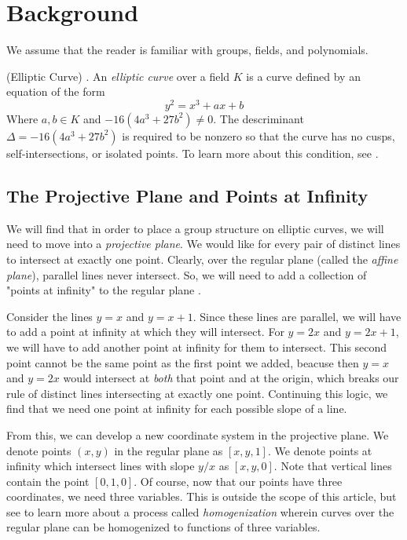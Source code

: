 \documentclass[]{math_paper}
\begin{document}
\section{Background} \label{sec:background}
We assume that the reader is familiar with groups, fields, and polynomials.

\begin{definition} (Elliptic Curve) \cite{stein2008elementary}. An \emph{elliptic curve} over a field $K$ is a curve defined by an equation of the form
    $$y^2 = x^3 + ax+ b$$
    Where $a, b \in K$ and $-16(4a^3 + 27b^2) \neq 0$. The descriminant $\Delta = -16(4a^3 + 27b^2)$ is required to be nonzero so that the curve has no cusps, self-intersections, or isolated points. To learn more about this condition, see \cite{Silverman:1338326}.
\end{definition}

\subsection{The Projective Plane and Points at Infinity}
We will find that in order to place a group structure on elliptic curves, we will need to move into a \emph{projective plane}. We would like for every pair of distinct lines to intersect at exactly one point. Clearly, over the regular plane (called the \emph{affine plane}), parallel lines never intersect. So, we will need to add a collection of "points at infinity" to the regular plane \cite{Fitchett}.

Consider the lines $y = x$ and $y = x + 1$. Since these lines are parallel, we will have to add a point at infinity at which they will intersect. For $y = 2x$ and $y = 2x + 1$, we will have to add another point at infinity for them to intersect. This second point cannot be the same point as the first point we added, beacuse then $y = x$ and $y = 2x$ would intersect at \emph{both} that point and at the origin, which breaks our rule of distinct lines intersecting at exactly one point. Continuing this logic, we find that we need one point at infinity for each possible slope of a line.

From this, we can develop a new coordinate system in the projective plane. We denote points $(x, y)$ in the regular plane as $[x, y, 1]$. We denote points at infinity which intersect lines with slope $y/x$ as $[x, y, 0]$. Note that vertical lines contain the point $[0, 1, 0]$. Of course, now that our points have three coordinates, we need three variables. This is outside the scope of this article, but see \cite{Fitchett} to learn more about a process called \emph{homogenization} wherein curves over the regular plane can be homogenized to functions of three variables.
\end{document}
